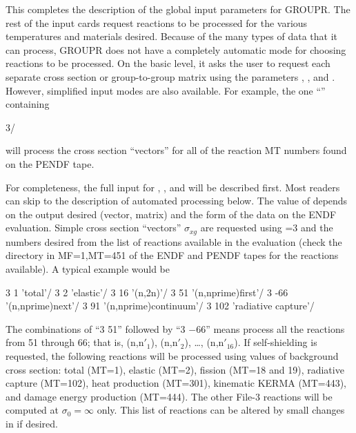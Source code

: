 This completes the description of the global input parameters for GROUPR.
The rest of the input cards request reactions to be processed for the
various temperatures and materials desired.  Because of the many types
of data that it can process, GROUPR does not have a completely
automatic mode for choosing reactions to be processed.  On the basic
level, it asks the user to request each separate cross section or
group-to-group matrix using the parameters , ,
and .  However, simplified input modes are also available.
For example, the one ``'' containing

\small
\begin{ccode}

    3/

\end{ccode}
\normalsize

\noindent
will process the cross section ``vectors'' for all of the reaction MT
numbers found on the PENDF tape.

For completeness, the full input for , ,
and  will be described first.  Most readers can skip
to the description of automated processing below.  The value of
 depends on the output desired (vector, matrix) and the
form of the data on the ENDF evaluation.  Simple cross section ``vectors''
$\sigma_{xg}$ are requested using =3 and the 
numbers desired from the list of reactions available in the evaluation
(check the directory in MF=1,MT=451 of the ENDF and PENDF tapes for the
reactions available).  A typical example would be

\small
\begin{ccode}

   3   1 'total'/
   3   2 'elastic'/
   3  16 '(n,2n)'/
   3  51 '(n,nprime)first'/
   3 -66 '(n,nprime)next'/
   3  91 '(n,nprime)continuum'/
   3 102 'radiative capture'/

\end{ccode}
\normalsize

\noindent
The combinations of ``3 51'' followed by ``3 $-$66'' means process all
the reactions from 51 through 66; that is, (n,n$'_1$), (n,n$'_2$),
\ldots, (n,n$'_{16}$).  If self-shielding is requested, the following
reactions will be processed using  values of background
cross section: total (MT=1), elastic (MT=2), fission (MT=18 and 19),
radiative capture (MT=102), heat production (MT=301), kinematic KERMA
(MT=443), and damage energy production (MT=444).  The other File-3
reactions will be computed at $\sigma_0{=}\infty$ only.  This list of
reactions can be altered by small changes in  if desired.

